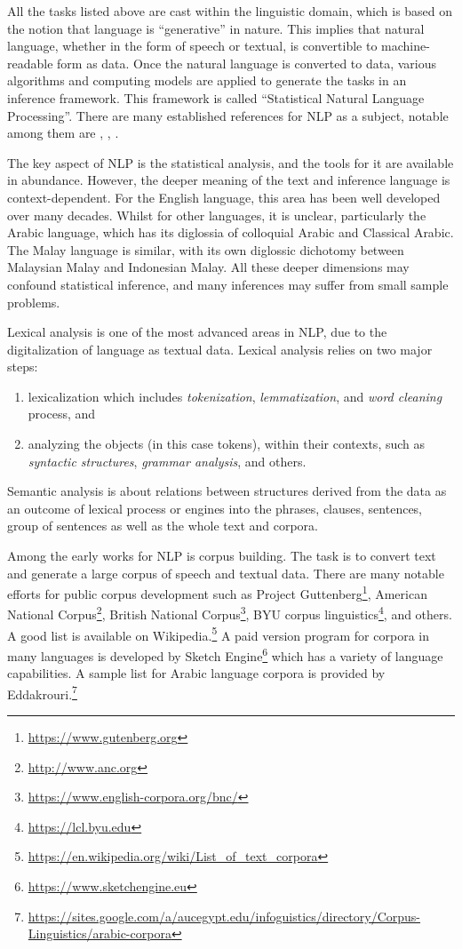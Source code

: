 \documentclass[
]{article}
\providecommand{\tightlist}{%
  \setlength{\itemsep}{0pt}\setlength{\parskip}{0pt}}
\begin{document}
All the tasks listed above are cast within the linguistic domain, which is based on the notion that language is ``generative'' in nature. This implies that natural language, whether in the form of speech or textual, is convertible to machine-readable form as data. Once the natural language is converted to data, various algorithms and computing models are applied to generate the tasks in an inference framework. This framework is called ``Statistical Natural Language Processing''. There are many established references for NLP as a subject, notable among them are \citet{manning1999}, \citet{manning2009}, \citet{jurafsky2000}.

The key aspect of NLP is the statistical analysis, and the tools for it are available in abundance. However, the deeper meaning of the text and inference language is context-dependent. For the English language, this area has been well developed over many decades. Whilst for other languages, it is unclear, particularly the Arabic language, which has its diglossia of colloquial Arabic and Classical Arabic. The Malay language is similar, with its own diglossic dichotomy between Malaysian Malay and Indonesian Malay. All these deeper dimensions may confound statistical inference, and many inferences may suffer from small sample problems.

Lexical analysis is one of the most advanced areas in NLP, due to the digitalization of language as textual data. Lexical analysis relies on two major steps:

\begin{enumerate}
\def\labelenumi{\alph{enumi})}
\tightlist
\item
  lexicalization which includes \emph{tokenization}, \emph{lemmatization}, and \emph{word cleaning} process, and
\item
  analyzing the objects (in this case tokens), within their contexts, such as \emph{syntactic structures}, \emph{grammar analysis}, and others.
\end{enumerate}

Semantic analysis is about relations between structures derived from the data as an outcome of lexical process or engines into the phrases, clauses, sentences, group of sentences as well as the whole text and corpora.

Among the early works for NLP is corpus building. The task is to convert text and generate a large corpus of speech and textual data. There are many notable efforts for public corpus development such as Project Guttenberg\footnote{\url{https://www.gutenberg.org}}, American National Corpus\footnote{\url{http://www.anc.org}}, British National Corpus\footnote{\url{https://www.english-corpora.org/bnc/}}, BYU corpus linguistics\footnote{\url{https://lcl.byu.edu}}, and others. A good list is available on Wikipedia.\footnote{\url{https://en.wikipedia.org/wiki/List_of_text_corpora}} A paid version program for corpora in many languages is developed by Sketch Engine\footnote{\url{https://www.sketchengine.eu}} which has a variety of language capabilities. A sample list for Arabic language corpora is provided by Eddakrouri.\footnote{\url{https://sites.google.com/a/aucegypt.edu/infoguistics/directory/Corpus-Linguistics/arabic-corpora}}
\end{document}
